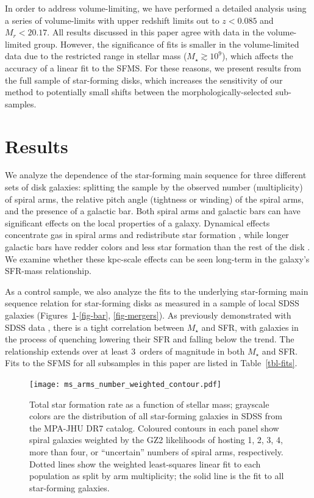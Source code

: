 \documentclass[useAMS,usenatbib]{mn2e}
\begin{document}
In order to address volume-limiting, we have performed a detailed analysis using a series of volume-limits with upper redshift limits out to $z<0.085$ and $M_r < 20.17$. All results discussed in this paper agree with data in the volume-limited group. However, the significance of fits is smaller in the volume-limited data due to the restricted range in stellar mass ($M_\star\gtrsim10^9$), which affects the accuracy of a linear fit to the SFMS. For these reasons, we present results from the full sample of star-forming disks, which increases the sensitivity of our method to potentially small shifts between the morphologically-selected sub-samples. 


\section{Results} \label{sec-results}

We analyze the dependence of the star-forming main sequence for three different sets of disk galaxies: splitting the sample by the observed number (multiplicity) of spiral arms, the relative pitch angle (tightness or winding) of the spiral arms, and the presence of a galactic bar. Both spiral arms and galactic bars can have significant effects on the local properties of a galaxy. Dynamical effects concentrate gas in spiral arms and redistribute star formation \citep{elm86,foy10}, while longer galactic bars have redder colors and less star formation than the rest of the disk \citep{hoy11,mas12a}. We examine whether these kpc-scale effects can be seen long-term in the galaxy's SFR-mass relationship. 

As a control sample, we also analyze the fits to the underlying star-forming main sequence relation for star-forming disks as measured in a sample of local SDSS galaxies (Figures~\ref{fig-number}-\ref{fig-bar}, \ref{fig-mergers}). As previously demonstrated with SDSS data \citep[e.g.,][]{bri04}, there is a tight correlation between $M_\star$ and SFR, with galaxies in the process of quenching lowering their SFR and falling below the trend. The relationship extends over at least 3~orders of magnitude in both $M_\star$ and SFR. Fits to the SFMS for all subsamples in this paper are listed in Table~\ref{tbl-fits}.

\begin{figure}
\texttt{[image: ms\_arms\_number\_weighted\_contour.pdf]}
\caption{Total star formation rate as a function of stellar mass; grayscale colors are the distribution of all star-forming galaxies in SDSS from the MPA-JHU DR7 catalog. Coloured contours in each panel show spiral galaxies weighted by the GZ2 likelihoods of hosting 1, 2, 3, 4, more than four, or ``uncertain'' numbers of spiral arms, respectively. Dotted lines show the weighted least-squares linear fit to each population as split by arm multiplicity; the solid line is the fit to all star-forming galaxies. 
\label{fig-number}}
\end{figure}
\end{document}
